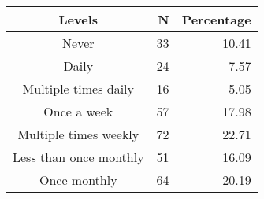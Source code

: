 \begin{longtable}{crr}
\toprule
\textbf{Levels} & \textbf{N} & \textbf{Percentage} \\ 
\midrule\addlinespace[2.5pt]
Never & 33 & 10.41 \\ 
Daily & 24 & 7.57 \\ 
Multiple times daily & 16 & 5.05 \\ 
Once a week & 57 & 17.98 \\ 
Multiple times weekly & 72 & 22.71 \\ 
Less than once monthly & 51 & 16.09 \\ 
Once monthly & 64 & 20.19 \\ 
\bottomrule
\end{longtable}

